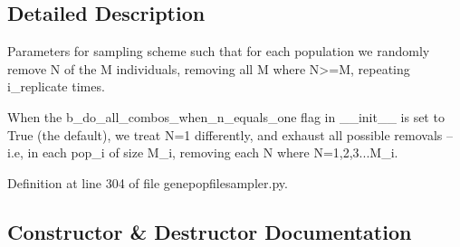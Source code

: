 \subsection{Detailed Description}
\begin{DoxyVerb}Parameters for sampling scheme such that for each population
we randomly remove N of the M individuals, removing all M where
N>=M, repeating i_replicate times. 

When the b_do_all_combos_when_n_equals_one flag in __init__ is
set to True (the default), we treat N=1 differently, and 
exhaust all possible removals -- i.e, in each pop_i 
of size M_i, removing each N where N=1,2,3...M_i.
\end{DoxyVerb}
 

Definition at line 304 of file genepopfilesampler.\+py.



\subsection{Constructor \& Destructor Documentation}
